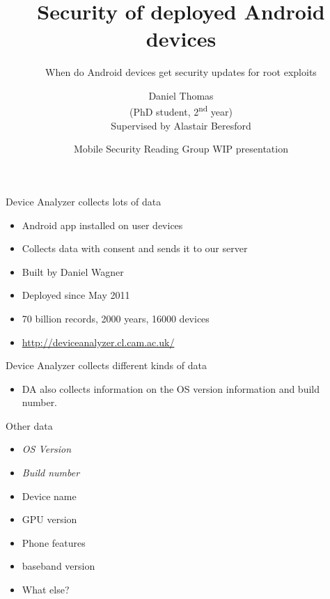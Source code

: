 \documentclass{beamer}
\title[Security Updates] %
{Security of deployed Android devices}
\subtitle
{When do Android devices get security updates for root exploits} %
\author[Daniel Thomas] %
{Daniel Thomas\\ \vspace{1em} \tiny{(PhD student, 2\textsuperscript{nd} year)} \\ \vspace{1em} \tiny{Supervised by Alastair Beresford}}
\institute{\vspace{-1em}
University of Cambridge
}
\date[2013-11-13] %
{Mobile Security Reading Group WIP presentation}
\begin{document}
\begin{frame}
  \titlepage
\end{frame}


\begin{frame}{Device Analyzer collects lots of data}{}
 \begin{itemize}
  \note{}
  \item Android app installed on user devices
  \item Collects data with consent and sends it to our server
  \item Built by Daniel Wagner
  \note{\\}
  \item Deployed since May 2011
  \note{\\}
  \item 70 billion records, 2000 years, 16000 devices
  \item \url{http://deviceanalyzer.cl.cam.ac.uk/}
 \end{itemize}
 \begin{center}
 \end{center}
\end{frame}

\begin{frame}{Device Analyzer collects different kinds of data}{}
 \begin{center}
  \vspace{-1em}
    
 \end{center}
 \vspace{-1.5em}
 \begin{itemize}
  \item DA also collects information on the OS version information and build number.
  \note{}
 \end{itemize}
\end{frame}

\begin{frame}{Other data}{}
\begin{itemize}
 \item \Large{ \emph{OS Version}}
 \item \emph{Build number}
 \item Device name
 \item GPU version
 \item Phone features
 \item baseband version
 \item What else?
\end{itemize}
\end{frame}
\end{document}
